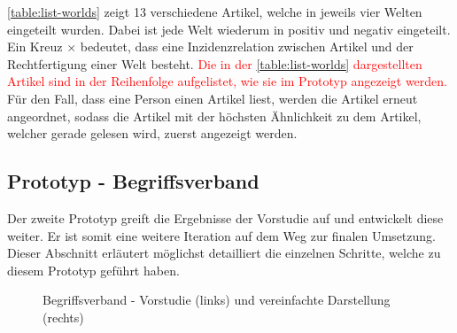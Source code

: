 \autoref{table:list-worlds} zeigt 13 verschiedene Artikel, welche in jeweils vier Welten eingeteilt wurden.
Dabei ist jede Welt wiederum in positiv und negativ eingeteilt.
Ein Kreuz $\times$ bedeutet, dass eine Inzidenzrelation zwischen Artikel und der Rechtfertigung einer Welt besteht.
\textcolor{red}{Die in der \autoref{table:list-worlds} dargestellten Artikel sind in der Reihenfolge aufgelistet, wie sie im Prototyp angezeigt werden.}
Für den Fall, dass eine Person einen Artikel liest, werden die Artikel erneut angeordnet, sodass die Artikel mit der höchsten Ähnlichkeit zu dem Artikel, welcher gerade gelesen wird, zuerst angezeigt werden.

\subsection{Prototyp - Begriffsverband}\label{subsubsec:prototyp-2}
Der zweite Prototyp greift die Ergebnisse der Vorstudie auf und entwickelt diese weiter.
Er ist somit eine weitere Iteration auf dem Weg zur finalen Umsetzung.
Dieser Abschnitt erläutert möglichst detailliert die einzelnen Schritte, welche zu diesem Prototyp geführt haben.\\

\begin{figure}[!ht]
    \centering
    \caption{Begriffsverband - Vorstudie (links) und vereinfachte Darstellung (rechts)}
    \label{fig:industry-comparison}
\end{figure}

